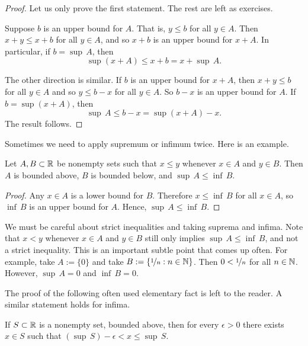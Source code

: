 \begin{proof}
Let us only prove the first statement.  The rest are left as exercises.

Suppose $b$ is an upper bound for $A$.  That is, $y \leq b$ for all $y \in A$.
Then $x+y \leq x+b$ for all $y \in A$, and so $x+b$ is an upper
bound for $x+A$.  In particular, if $b = \sup\, A$, then
\begin{equation*}
\sup (x+A) \leq x+b = x+ \sup\, A .
\end{equation*}

The other direction is similar.  If $b$ is an upper bound for $x+A$,
then $x+y \leq b$
for all $y \in A$ and so $y \leq b-x$ for all $y \in A$.
So $b-x$ is an upper bound for $A$.  If $b =
\sup (x+A)$, then 
\begin{equation*}
\sup\, A \leq b-x = \sup (x+A) -x .
\end{equation*}
The result follows.
\end{proof}

Sometimes we need to apply supremum or infimum twice.  Here is an example.

\begin{prop} \label{infsupineq:prop}
Let $A, B \subset {\mathbb{R}}$ be nonempty sets such that $x \leq y$ whenever $x \in A$ and
$y \in B$.  Then $A$ is bounded above, $B$ is bounded below, and $\sup\, A \leq \inf\, B$.
\end{prop}

\begin{proof}
Any $x \in A$ is a lower bound for $B$.  Therefore
$x \leq \inf\, B$ for all $x \in A$, so $\inf\, B$ is an upper bound for
$A$.
Hence,
$\sup\, A \leq \inf\, B$.
\end{proof}

We must be careful about strict inequalities and taking suprema and
infima.  Note that
$x < y$ whenever $x \in A$ and
$y \in B$ still only implies $\sup\, A \leq \inf\, B$, and not a strict
inequality.  This is an important subtle point that comes up often.
For example, take $A := \{ 0 \}$ and take $B := \{ \nicefrac{1}{n}
: n \in {\mathbb{N}} \}$.
Then $0 < \nicefrac{1}{n}$
for all $n \in {\mathbb{N}}$.  However, $\sup\, A = 0$ and $\inf\, B = 0$.


The proof of the following
often used elementary fact is left to the reader.
A similar statement holds for infima.

\begin{prop} \label{prop:existsxepsfromsup}
If $S \subset {\mathbb{R}}$ is a nonempty set, bounded above,
then for every $\epsilon > 0$ there exists $x \in S$ such
that $(\sup\, S) - \epsilon < x \leq \sup\, S$.
\end{prop}


